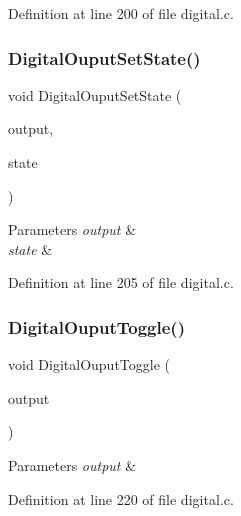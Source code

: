 Definition at line 200 of file digital.\+c.

\mbox{\label{group__hal_ga0483a65cba06b635483c4c7749552dd1}} 
\subsubsection{\texorpdfstring{Digital\+Ouput\+Set\+State()}{DigitalOuputSetState()}}
{\footnotesize\ttfamily void Digital\+Ouput\+Set\+State (\begin{DoxyParamCaption}\item[{\hyperlink{group___plantilla_ga3e63b19d3d0dbfbfb2c50b3ac1f69aa0}{digital\+\_\+output\+\_\+t}}]{output,  }\item[{bool}]{state }\end{DoxyParamCaption})}


\begin{DoxyParams}{Parameters}
{\em output} & \\
\hline
{\em state} & \\
\hline
\end{DoxyParams}


Definition at line 205 of file digital.\+c.

\mbox{\label{group__hal_gaa8e0bc6b2e09229fad9a738b32208e9f}} 
\subsubsection{\texorpdfstring{Digital\+Ouput\+Toggle()}{DigitalOuputToggle()}}
{\footnotesize\ttfamily void Digital\+Ouput\+Toggle (\begin{DoxyParamCaption}\item[{\hyperlink{group___plantilla_ga3e63b19d3d0dbfbfb2c50b3ac1f69aa0}{digital\+\_\+output\+\_\+t}}]{output }\end{DoxyParamCaption})}


\begin{DoxyParams}{Parameters}
{\em output} & \\
\hline
\end{DoxyParams}


Definition at line 220 of file digital.\+c.

